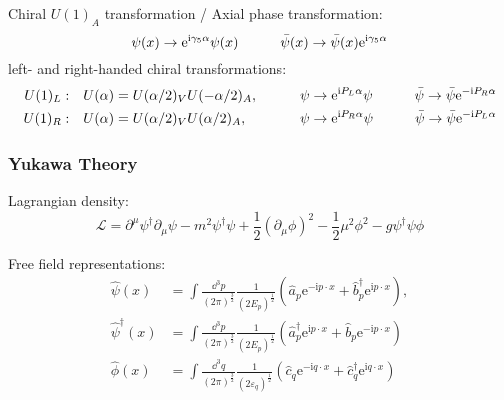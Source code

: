 			\noindent
			Chiral $U(1)_A$ transformation / Axial phase transformation:
			\begin{equation}
				\psi(x) \to \mathrm{e}^{\mathrm{i} \gamma_5 \alpha} \psi(x)
				\hspace{30pt} \bar{\psi}(x) \to \bar{\psi}(x) \mathrm{e}^{\mathrm{i} \gamma_5 \alpha}
			\end{equation}
			left- and right-handed chiral transformations:
			\begin{align}
				U(1)_L:&\quad U(\alpha) = U(\alpha/2)_V U(-\alpha/2)_A,
				\hspace{30pt} \psi \to \mathrm{e}^{\mathrm{i} P_L \alpha} \psi
				\hspace{30pt} \bar{\psi} \to \bar{\psi} \mathrm{e}^{-\mathrm{i} P_R \alpha} \\
				U(1)_R:&\quad U(\alpha) = U(\alpha/2)_V U(\alpha/2)_A, \phantom{-}
				\hspace{30pt} \psi \to \mathrm{e}^{\mathrm{i} P_R \alpha} \psi
				\hspace{30pt} \bar{\psi} \to \bar{\psi} \mathrm{e}^{-\mathrm{i} P_L \alpha}
			\end{align}


		\subsubsection{Yukawa Theory}
			Lagrangian density:
			\begin{equation}
				\mathcal{L}=\partial^{\mu}\psi^{\dagger}\partial_{\mu}\psi-m^{2}\psi^{\dagger}\psi+\frac{1}{2}(\partial_{\mu}\phi)^{2}-\frac{1}{2}\mu^{2}\phi^{2}-g\psi^{\dagger}\psi\phi
			\end{equation}

			\noindent
			Free field representations:
			\begin{equation}
				\begin{aligned}
					\hat{\psi}(x) &= \int\frac{\dd^{3}p}{\left(2\pi\right)^{\frac{3}{2}}}\frac{1}{(2E_{p})^{\frac{1}{2}}}\left(\hat{a}_{p}\mathrm{e}^{-\mathrm{i}p\cdot x}+\hat{b}_{p}^{\dagger}\mathrm{e}^{\mathrm{i}p\cdot x}\right), \\
					\hat{\psi}^{\dagger}(x) &= \int\frac{\dd^{3}p}{(2\pi)^{\frac{3}{2}}}\frac{1}{(2E_{p})^{\frac{1}{2}}}\left(\hat{a}_{p}^{\dagger}\mathrm{e}^{\mathrm{i}p\cdot x}+\hat{b}_{p}\mathrm{e}^{-\mathrm{i}p\cdot x}\right) \\
					\hat{\phi}(x) &=\int\frac{\dd^{3}q}{\left(2\pi\right)^{\frac{3}{2}}}\frac{1}{\left(2\varepsilon_{q}\right)^{\frac{1}{2}}}\left(\hat{c}_{q}\mathrm{e}^{-\mathrm{i}q\cdot x}+\hat{c}_{q}^{\dagger}\mathrm{e}^{\mathrm{i}q\cdot x}\right) \\
				\end{aligned}
			\end{equation}

